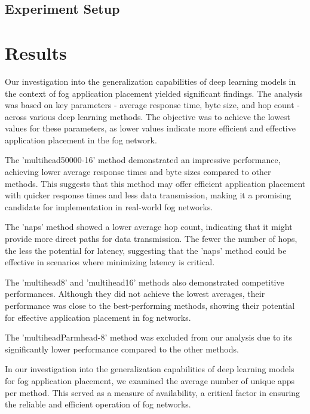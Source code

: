 \documentclass[conference]{IEEEtran}
\begin{document}


\subsection{Experiment Setup}


\section{Results}

Our investigation into the generalization capabilities of deep learning models in the context of fog application placement yielded significant findings. The analysis was based on key parameters - average response time, byte size, and hop count - across various deep learning methods. The objective was to achieve the lowest values for these parameters, as lower values indicate more efficient and effective application placement in the fog network.

The 'multihead50000-16' method demonstrated an impressive performance, achieving lower average response times and byte sizes compared to other methods. This suggests that this method may offer efficient application placement with quicker response times and less data transmission, making it a promising candidate for implementation in real-world fog networks.

The 'naps' method showed a lower average hop count, indicating that it might provide more direct paths for data transmission. The fewer the number of hops, the less the potential for latency, suggesting that the 'naps' method could be effective in scenarios where minimizing latency is critical.

The 'multihead8' and 'multihead16' methods also demonstrated competitive performances. Although they did not achieve the lowest averages, their performance was close to the best-performing methods, showing their potential for effective application placement in fog networks.

The 'multiheadParmhead-8' method was excluded from our analysis due to its significantly lower performance compared to the other methods.

In our investigation into the generalization capabilities of deep learning models for fog application placement, we examined the average number of unique apps per method. This served as a measure of availability, a critical factor in ensuring the reliable and efficient operation of fog networks.
\end{document}

